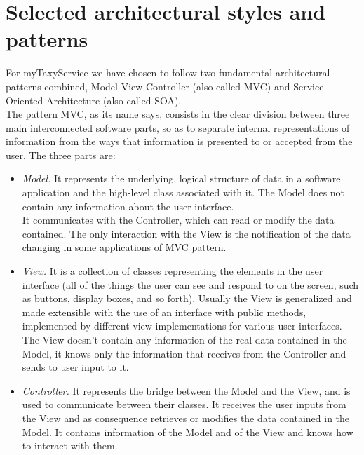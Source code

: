 \documentclass[\mainpath/main]{subfiles}
\begin{document}
\section{Selected architectural styles and patterns}
\label{ArchitecturalDesign:design_patterns}
For myTaxyService we have chosen to follow two fundamental architectural patterns combined, Model-View-Controller (also called MVC) and Service-Oriented Architecture (also called SOA).\\
The pattern MVC, as its name says, consists in the clear division between three main interconnected software parts, so as to separate internal representations of information from the ways that information is presented to or accepted from the user. The three parts are:
\begin{itemize}
	\item \textit{Model.} It represents the underlying, logical structure of data in a software application and the high-level class associated with it. The Model does not contain any information about the user interface.\\
	It communicates with the Controller, which can read or modify the data contained. The only interaction with the View is the notification of the data changing in some applications of MVC pattern.
	
	\item \textit{View.} It is a collection of classes representing the elements in the user interface (all of the things the user can see and respond to on the screen, such as buttons, display boxes, and so forth). Usually the View is generalized and made extensible with the use of an interface with public methods, implemented by different view implementations for various user interfaces.\\
	The View doesn't contain any information of the real data contained in the Model, it knows only the information that receives from the Controller and sends to user input to it.
	
	
	\item \textit{Controller.} It represents the bridge between the Model and the View, and is used to communicate between their classes. It receives the user inputs from the View and as consequence retrieves or modifies the data contained in the Model. It contains information of the Model and of the View and knows how to interact with them.\\
\end{itemize}
\end{document}
